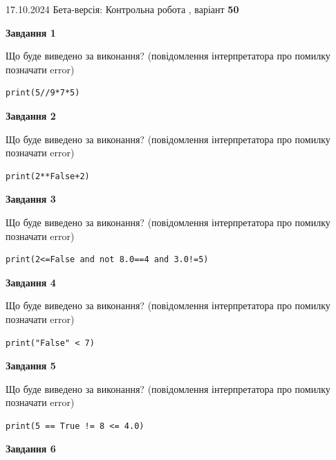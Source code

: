 \documentclass[12pt, ukrainian]{article}
\begin{document}
{\Large{17.10.2024 Бета-версія: Контрольна робота , варіант  \No \textbf { 50 }\par}}
{
\begin {large}
{\begin {center}\textbf{Завдання 1}\end {center}}

Що буде виведено за виконання? (повідомлення інтерпретатора про помилку позначати error)\par
\begin{verbatim}
print(5//9*7*5)
\end{verbatim}

{\begin {center}\textbf{Завдання 2}\end {center}}

Що буде виведено за виконання? (повідомлення інтерпретатора про помилку позначати error)\par
\begin{verbatim}
print(2**False+2)
\end{verbatim}

{\begin {center}\textbf{Завдання 3}\end {center}}

Що буде виведено за виконання? (повідомлення інтерпретатора про помилку позначати error)\par
\begin{verbatim}
print(2<=False and not 8.0==4 and 3.0!=5)
\end{verbatim}

{\begin {center}\textbf{Завдання 4}\end {center}}

Що буде виведено за виконання? (повідомлення інтерпретатора про помилку позначати error)\par
\begin{verbatim}
print("False" < 7)
\end{verbatim}

{\begin {center}\textbf{Завдання 5}\end {center}}

Що буде виведено за виконання? (повідомлення інтерпретатора про помилку позначати error)\par
\begin{verbatim}
print(5 == True != 8 <= 4.0)
\end{verbatim}

{\begin {center}\textbf{Завдання 6}\end {center}}


\end{large}}
\end{document}
